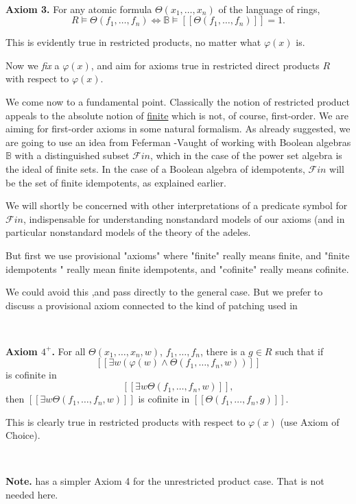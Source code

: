 \documentclass[12pt]{amsart}
\def\B{\mathbb{B}}
\numberwithin{equation}{section}
\begin{document}
\

{\bf Axiom 3.} For any atomic formula $\Theta(x_1,\dots,x_n)$ of the language of rings,
$$R\models \Theta(f_1,\dots,f_n) \Leftrightarrow \B\models [[\Theta(f_1,\dots,f_n)]]=1.$$

This is evidently true in restricted products, no matter what $\varphi(x)$ is. 

Now we {\it fix} a $\varphi(x)$, and aim for axioms true in restricted direct products $R$ with respect to $\varphi(x)$.

We come now to a fundamental point. Classically the notion of restricted product appeals to the 
absolute notion of \underline{finite} which is not, of course, first-order. We are aiming for first-order axioms in some natural formalism. As already suggested, we are going to use an idea from Feferman -Vaught \cite{FV} of working with Boolean algebras $\B$ with a distinguished subset $\mathcal{F}in$, which in the case of the power set algebra is the ideal of finite sets. In the case of a Boolean algebra of idempotents, $\mathcal{F}in$ will be the set of finite idempotents, as explained earlier. 

We will shortly be concerned with other interpretations of a predicate symbol for $\mathcal{F}in$, indispensable for understanding nonstandard models of our axioms (and in particular nonstandard models of the theory of the adeles.

But first we use provisional "axioms" where "finite" really means finite, and "finite idempotents " really mean finite idempotents, and "cofinite" really means cofinite.

We could avoid this ,and pass directly to the general case. But we prefer to discuss a provisional axiom connected to the kind of patching used in \cite{FV}

\

{\bf Axiom $4^+$.} For all $\Theta(x_1,\dots,x_n,w)$, $f_1,\dots,f_n$, there is a $g\in R$ such that if 
$$[[\exists w (\varphi(w) \wedge \Theta(f_1,\dots,f_n,w))]]$$ 
is cofinite in 
$$[[\exists w \Theta(f_1,\dots,f_n,w)]],$$ 
then $[[\exists w \Theta(f_1,\dots,f_n,w)]]$ is cofinite in 
$[[\Theta(f_1,\dots,f_n,g)]]$.

This is clearly true in restricted products with respect to $\varphi(x)$ (use Axiom of Choice).

\

{\bf Note.}  \cite{elem-prod} has a simpler Axiom 4 for the unrestricted product case. That is not needed here.
\end{document}
